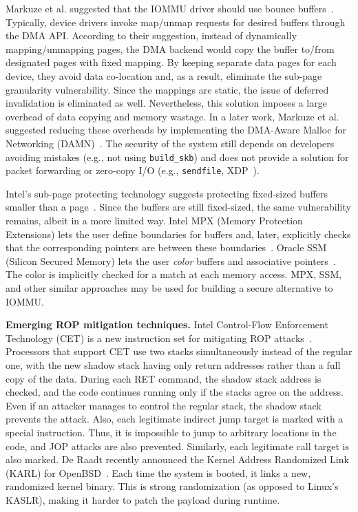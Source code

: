 Markuze et al. suggested that the IOMMU driver should use bounce buffers~\cite{MMT16}. Typically, device drivers invoke map/unmap requests for desired buffers through the DMA API. According to their suggestion, instead of dynamically mapping/unmapping pages, the DMA backend would copy the buffer to/from designated pages with fixed mapping. By keeping separate data pages for each device, they avoid data co-location and, as a result, eliminate the sub-page granularity vulnerability. Since the mappings are static, the issue of deferred invalidation is eliminated as well. 
%
Nevertheless, this solution imposes a large overhead of data copying and memory wastage. In a later work, Markuze et al. suggested reducing these overheads by implementing the DMA-Aware Malloc for Networking (DAMN)~\cite{MSMT18}. The security of the system still depends on developers avoiding mistakes (e.g., not using \texttt{build\_skb}) and does not provide a solution for packet forwarding or zero-copy I/O (e.g., \texttt{sendfile}, XDP~\cite{xdp}). %

Intel’s sub-page protecting technology suggests protecting fixed-sized buffers smaller than a page~\cite{Int18}. Since the buffers are still fixed-sized, the same vulnerability remains, albeit in a more limited way. Intel MPX (Memory Protection Extensions) lets the user define boundaries for buffers and, later, explicitly checks that the corresponding pointers are between these boundaries~\cite{Int16a}. Oracle SSM (Silicon Secured Memory) lets the user \emph{color} buffers and associative pointers~\cite{Ora15}. The color is implicitly checked for a match at each memory access. MPX, SSM, and other similar approaches may be used for building a secure alternative to IOMMU. 

\smallskip
\noindent\textbf{Emerging ROP mitigation techniques.}
Intel Control-Flow Enforcement Technology (CET) is a new instruction set for mitigating ROP attacks~\cite{Int17}. Processors that support CET use two stacks simultaneously instead of the regular one, with the new shadow stack having only return addresses rather than a full copy of the data. During each RET command, the shadow stack address is checked, and the code continues running only if the stacks agree on the address. Even if an attacker manages to control the regular stack, the shadow stack prevents the attack. Also, each legitimate indirect jump target is marked with a special instruction. Thus, it is impossible to jump to arbitrary locations in the code, and JOP attacks are also prevented. Similarly, each legitimate call target is also marked. De Raadt recently announced the Kernel Address Randomized Link (KARL) for OpenBSD~\cite{dr17}. Each time the system is booted, it links a new, randomized kernel binary. This is strong randomization (as opposed to Linux’s KASLR), making it harder to patch the payload during runtime. 

